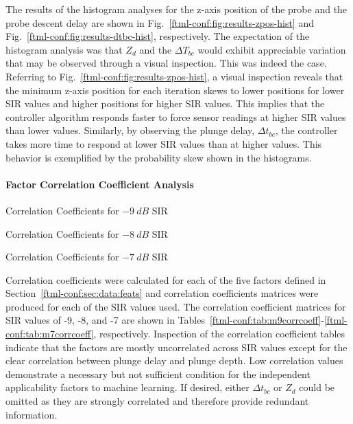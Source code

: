 The results of the histogram analyses for the z-axis position of the probe and the probe descent delay are shown in Fig.~\ref{ftml-conf:fig:results-zpos-hist} and Fig.~\ref{ftml-conf:fig:results-dtbc-hist}, respectively.  The expectation of the histogram analysis was that $Z_d$ and the $\Delta{T}_{bc}$ would exhibit appreciable variation that may be observed through a visual inspection.  This was indeed the case.  Referring to Fig.~\ref{ftml-conf:fig:results-zpos-hist}, a visual inspection reveals that the minimum z-axis position for each iteration skews to lower positions for lower SIR values and higher positions for higher SIR values.  This implies that the controller algorithm responds faster to force sensor readings at higher SIR values than lower values.  Similarly, by observing the plunge delay, $\Delta{t}_{bc}$, the controller takes more time to respond at lower SIR values than at higher values.  This behavior is exemplified by the probability skew shown in the histograms. 

\paragraph{Factor Correlation Coefficient Analysis}

\begin{table}[!ht]

   	\centering
   	\caption{Correlation Coefficients for $-9\ dB$ SIR}
   	\label{ftml-conf:tab:m9corrcoeff}
   	
   	\vspace{5mm}

   	\centering
   	\caption{Correlation Coefficients for $-8\ dB$ SIR}
   	\label{ftml-conf:tab:m8corrcoeff}
   	
   	\vspace{5mm}

   	\centering
   	\caption{Correlation Coefficients for $-7\ dB$ SIR}
   	\label{ftml-conf:tab:m7corrcoeff}
   	

\end{table}

Correlation coefficients were calculated for each of the five factors defined in Section~\ref{ftml-conf:sec:data:feats} and correlation coefficients matrices were produced for each of the SIR values used.  The correlation coefficient matrices for SIR values of -9, -8, and -7 are shown in Tables~\ref{ftml-conf:tab:m9corrcoeff}-\ref{ftml-conf:tab:m7corrcoeff}, respectively. Inspection of the correlation coefficient tables indicate that the factors are mostly uncorrelated across SIR values except for the clear correlation between plunge delay and plunge depth. Low correlation values demonstrate a necessary but not sufficient condition for the independent applicability factors to machine learning.  If desired, either $\Delta{t}_{bc}$ or $Z_d$ could be omitted as they are strongly correlated and therefore provide redundant information.

